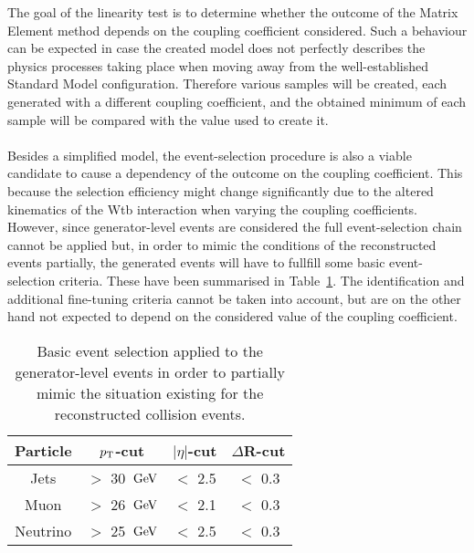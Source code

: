 The goal of the linearity test is to determine whether the outcome of the Matrix Element method depends on the coupling coefficient considered.
Such a behaviour can be expected in case the created model does not perfectly describes the physics processes taking place when moving away from the well-established Standard Model configuration.
Therefore various samples will be created, each generated with a different coupling coefficient, and the obtained minimum of each sample will be compared with the value used to create it.
\\
\\
Besides a simplified model, the event-selection procedure is also a viable candidate to cause a dependency of the outcome on the coupling coefficient.
This because the selection efficiency might change significantly due to the altered kinematics of the Wtb interaction when varying the coupling coefficients.
However, since generator-level events are considered the full event-selection chain cannot be applied but, in order to mimic the conditions of the reconstructed events partially, the generated events will have to fullfill some basic event-selection criteria. These have been summarised in Table~\ref{table::GenCuts}.
The identification and additional fine-tuning criteria cannot be taken into account, but are on the other hand not expected to depend on the considered value of the coupling coefficient.
\begin{table}[h!t]
 \centering
 \caption{Basic event selection applied to the generator-level events in order to partially mimic the situation existing for the reconstructed collision events.} \label{table::GenCuts}
 \renewcommand{\arraystretch}{1.2}
 \begin{tabular}{c|c|c|c}
  Particle 	& $p_{\rm T}$-cut 		& $\vert \eta \vert$-cut 	& $\Delta$R-cut 	\\
  \hline
  Jets 		& $>$ 30 $\, \mathrm{GeV}$ 	& $<$ 2.5			& $<$ 0.3		\\
  Muon		& $>$ 26 $\, \mathrm{GeV}$		& $<$ 2.1			& $<$ 0.3		\\
  Neutrino 	& $>$ 25 $\, \mathrm{GeV}$		& $<$ 2.5			& $<$ 0.3		
 \end{tabular}
\end{table}


